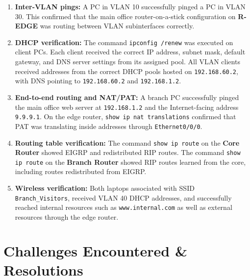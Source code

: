 \documentclass[12pt,a4paper]{article}
\begin{document}
\begin{enumerate}
    \item \textbf{Inter-VLAN pings:} A PC in VLAN 10 successfully pinged a PC in VLAN 30. This confirmed that the main office router-on-a-stick configuration on \textbf{R-EDGE} was routing between VLAN subinterfaces correctly.

    \item \textbf{DHCP verification:} The command \texttt{ipconfig /renew} was executed on client PCs. Each client received the correct IP address, subnet mask, default gateway, and DNS server settings from its assigned pool. All VLAN clients received addresses from the correct DHCP pools hosted on \texttt{192.168.60.2}, with DNS pointing to \texttt{192.168.60.2} and \texttt{192.168.1.2}.

    \item \textbf{End-to-end routing and NAT/PAT:} A branch PC successfully pinged the main office web server at \texttt{192.168.1.2} and the Internet-facing address \texttt{9.9.9.1}. On the edge router, \texttt{show ip nat translations} confirmed that PAT was translating inside addresses through \texttt{Ethernet0/0/0}.

    \item \textbf{Routing table verification:} The command \texttt{show ip route} on the \textbf{Core Router} showed EIGRP and redistributed RIP routes. The command \texttt{show ip route} on the \textbf{Branch Router} showed RIP routes learned from the core, including routes redistributed from EIGRP.

    \item \textbf{Wireless verification:} Both laptops associated with SSID \texttt{Branch\_Visitors}, received VLAN 40 DHCP addresses, and successfully reached internal resources such as \texttt{www.internal.com} as well as external resources through the edge router.
\end{enumerate}

\section{Challenges Encountered \& Resolutions}
\end{document}
